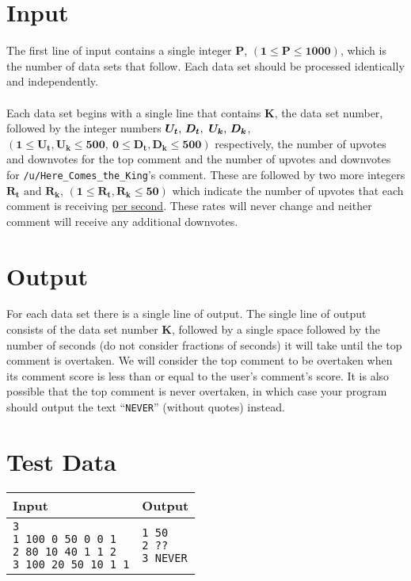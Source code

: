 \documentclass[11pt]{article}
\begin{document}
\section{Input}
The first line of input contains a single integer $\boldsymbol{P}$,
$(\boldsymbol{1} \le \boldsymbol{P} \le \boldsymbol{1000})$, which is the
number of data sets that follow. Each data set should be processed identically
and independently.
\\\\
Each data set begins with a single line that contains $\boldsymbol{K}$, the data
set number, followed by the integer numbers $\boldsymbol{U_t}\text,\ \boldsymbol{D_t},\ 
\boldsymbol{U_k}\text,\ \boldsymbol{D_k}$, $(\boldsymbol{1} \le \boldsymbol{U_t},
\boldsymbol{U_k} \le \boldsymbol{500},\ \boldsymbol{0} \le \boldsymbol{D_t},
\boldsymbol{D_k} \le \boldsymbol{500})$ respectively, the number of upvotes and
downvotes for the top comment and the number of upvotes and downvotes for
\texttt{/u/Here\_Comes\_the\_King}'s comment. These are followed by two more
integers $\boldsymbol{R_t}\text{ and }\boldsymbol{R_k}$, $(\boldsymbol{1} \le \boldsymbol{R_t},
\boldsymbol{R_k} \le \boldsymbol{50})$ which indicate the number
of upvotes that each comment is receiving \underline{per second}. These rates
will never change and neither comment will receive any additional downvotes.

\section{Output}
For each data set there is a single line of output. The single line of output
consists of the data set number $\boldsymbol{K}$, followed by a single space
followed by the number of seconds (do not consider fractions of seconds) it
will take until the top comment is overtaken. We will consider the top comment
to be overtaken when its comment score is less than or equal to the user's
comment's score. It is also possible that the top comment is never overtaken,
in which case your program should output the text ``\texttt{NEVER}''
(without quotes) instead.

\section{Test Data}
\begin{tabularx}{\textwidth}{|X|X|}
	\hline
	Input & Output \\ \hline
	\parbox[t]{5cm}{
	\texttt{3\\
			1 100 0 50 0 0 1\\
			2 80 10 40 1 1 2\\
			3 100 20 50 10 1 1\\
	}} &
	\parbox[t]{5cm}{
	\texttt{1 50\\
			2 ??\\
			3 NEVER\\
	}}\\
	\hline
\end{tabularx}
\end{document}
